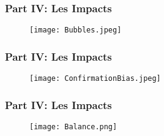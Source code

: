\begin{frame}
    \frametitle{Part IV: Les Impacts}

    \begin{figure}
        \centering
        \texttt{[image: Bubbles.jpeg]}
    \end{figure}

\end{frame}

\begin{frame}
    \frametitle{Part IV: Les Impacts}

    \begin{figure}
        \centering
        \texttt{[image: ConfirmationBias.jpeg]}
    \end{figure}

\end{frame}

\begin{frame}
    \frametitle{Part IV: Les Impacts}

    \begin{figure}
        \centering
        \texttt{[image: Balance.png]}
    \end{figure}

\end{frame}